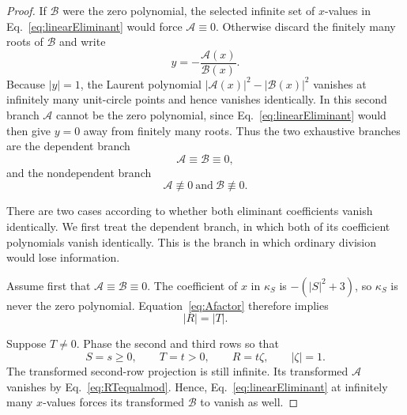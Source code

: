 \begin{proof}
If $\mathcal B$ were the zero polynomial, the selected infinite set of $x$-values in Eq.~\eqref{eq:linearEliminant} would force $\mathcal A\equiv0$.  Otherwise discard the finitely many roots of $\mathcal B$ and write
\begin{equation}
y=-\frac{\mathcal A(x)}{\mathcal B(x)}.
\label{eq:yquotient}
\end{equation}
Because $|y|=1$, the Laurent polynomial $|\mathcal A(x)|^2-|\mathcal B(x)|^2$ vanishes at infinitely many unit-circle points and hence vanishes identically.  In this second branch $\mathcal A$ cannot be the zero polynomial, since Eq.~\eqref{eq:linearEliminant} would then give $y=0$ away from finitely many roots.  Thus the two exhaustive branches are the dependent branch
\begin{equation}
\mathcal A\equiv\mathcal B\equiv0,
\label{eq:dependent-branch}
\end{equation}
and the nondependent branch
\begin{equation}
\mathcal A\not\equiv0\ \text{and}\ \mathcal B\not\equiv0.
\label{eq:nondependent-branch}
\end{equation}

There are two cases according to whether both eliminant coefficients vanish identically. We first treat the dependent branch, in which both of its coefficient polynomials vanish identically. This is the branch in which ordinary division would lose information.

Assume first that $\mathcal A\equiv\mathcal B\equiv0$.  The coefficient of $x$ in $\kappa_S$ is $-(|S|^2+3)$, so $\kappa_S$ is never the zero polynomial.  Equation~\eqref{eq:Afactor} therefore implies
\begin{equation}
|R|=|T|.
\label{eq:RTequalmod}
\end{equation}

Suppose $T\neq0$.  Phase the second and third rows so that
\begin{equation}
S=s\geq0,
\qquad T=t>0,
\qquad R=t\zeta,
\qquad |\zeta|=1.
\label{eq:dependentnormalization}
\end{equation}
The transformed second-row projection is still infinite.  Its transformed $\mathcal A$ vanishes by Eq.~\eqref{eq:RTequalmod}. Hence, Eq.~\eqref{eq:linearEliminant} at infinitely many $x$-values forces its transformed $\mathcal B$ to vanish as well.


\end{proof}
